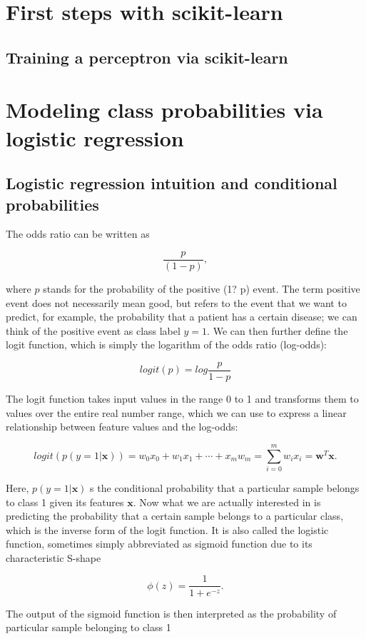 \documentclass{report}
\begin{document}
\section{First steps with scikit-learn}
\subsection{Training a perceptron via scikit-learn}
\section{Modeling class probabilities via logistic regression}
\subsection{Logistic regression intuition and conditional probabilities}

The odds ratio can be written as

\[
\frac{p}{(1-p)},
\]

where $p$ stands for the probability of the positive (1? p)
 event. The term positive event does not necessarily mean good, but refers to the event that we want to predict, for example, the probability that a patient has a certain disease; we can think of the positive event as class label $y =1$. We can then further define the logit function, which is simply the logarithm of the odds ratio (log-odds):

\[
logit(p) = log \frac{p}{1-p}
\]

The logit function takes input values in the range 0 to 1 and transforms them to values over the entire real number range, which we can use to express a linear relationship between feature values and the log-odds:

\[
logit ( p (y=1 | \mathbf{x})) = w_0 x_0 + w_1 x_1 + \cdots + x_m w_m = \sum^{m}_{i=0} w_i x_i = \mathbf{w}^T \mathbf{x}.
\]

Here, $p(y=1 | \mathbf{x})$ s the conditional probability that a particular sample belongs to class 1 given its features $\mathbf{x}$. Now what we are actually interested in is predicting the probability that a certain sample belongs to a particular class, which is the inverse form of the logit function. It is also called the logistic function, sometimes simply abbreviated as sigmoid function due to its characteristic S-shape

\[
\phi(z) = \frac{1}{1+e^{-z}}.
\]

The output of the sigmoid function is then interpreted as the probability of particular sample belonging to class 1
\end{document}
